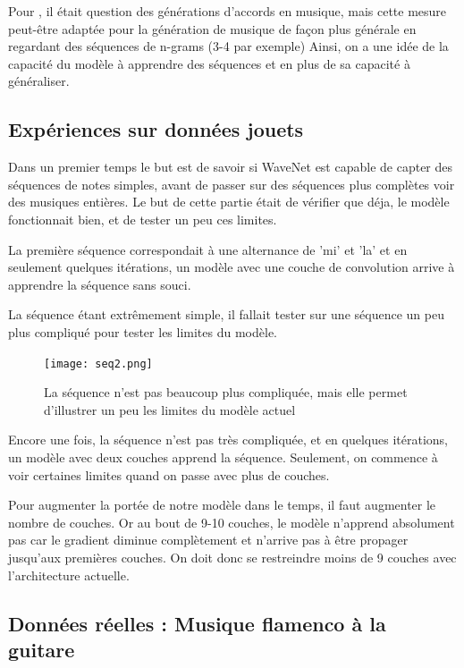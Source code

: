 \documentclass[a4paper]{article}
\begin{document}
Pour \cite{hadj16}, il était question des générations d'accords en musique, mais cette mesure peut-être adaptée pour la génération de musique de façon plus générale en regardant des séquences de n-grams (3-4 par exemple)
Ainsi, on a une idée de la capacité du modèle à apprendre des séquences et en plus de sa capacité à généraliser.

\subsection{Expériences sur données jouets}\label{sec:playground}

Dans un premier temps le but est de savoir si WaveNet est capable de capter des séquences de notes simples, avant de passer sur des séquences plus complètes voir des musiques entières.
Le but de cette partie était de vérifier que déja, le modèle fonctionnait bien, et de tester un peu ces limites.

La première séquence correspondait à une alternance de 'mi' et 'la' et en seulement quelques itérations, un modèle avec une couche de convolution arrive à apprendre la séquence sans souci.

La séquence étant extrêmement simple, il fallait tester sur une séquence un peu plus compliqué pour tester les limites du modèle.

\begin{figure}[ht]
  \caption{La séquence n'est pas beaucoup plus compliquée, mais elle permet d'illustrer un peu les limites du modèle actuel}
  \texttt{[image: seq2.png]}
  \label{fig:noteRepr}
\end{figure}

Encore une fois, la séquence n'est pas très compliquée, et en quelques itérations, un modèle avec deux couches apprend la séquence. Seulement, on commence à voir certaines limites quand on passe avec plus de couches.

Pour augmenter la portée de notre modèle dans le temps, il faut augmenter le nombre de couches. Or au bout de 9-10 couches, le modèle n'apprend absolument pas car le gradient diminue complètement et n'arrive pas à être propager jusqu'aux premières couches. On doit donc se restreindre moins de 9 couches avec l'architecture actuelle.

\subsection{Données réelles : Musique flamenco à la guitare}
\end{document}

